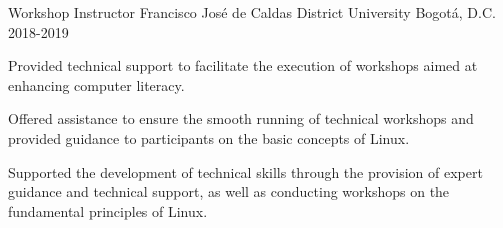 \begin{cventries}
\cventry
{Workshop Instructor} %
{Francisco José de Caldas District University} %
{Bogotá, D.C.} %
{2018-2019} %
{ %
\begin{cvitems}
\item {Provided technical support to facilitate the execution of workshops aimed at enhancing computer literacy.}
\item {Offered assistance to ensure the smooth running of technical workshops and provided guidance to participants on the basic concepts of Linux.}
\item {Supported the development of technical skills through the provision of expert guidance and technical support, as well as conducting workshops on the fundamental principles of Linux.}
\end{cvitems}
}


\end{cventries}